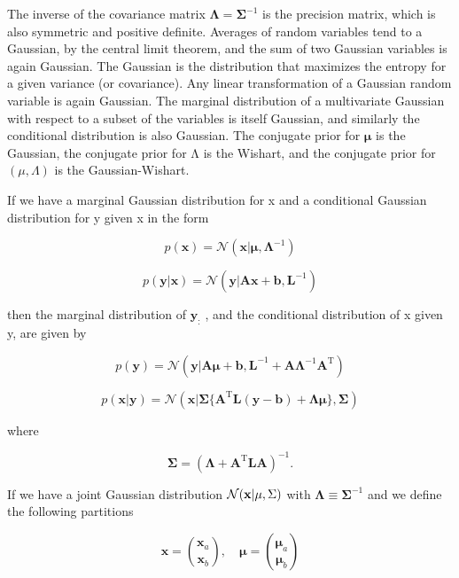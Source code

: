 \documentclass[
  10
]{article}
\begin{document}
The inverse of the covariance matrix
\(\pmb { \Lambda } = \pmb { \Sigma } ^ { - 1 }\) is the precision
matrix, which is also symmetric and positive definite. Averages of
random variables tend to a Gaussian, by the central limit theorem, and
the sum of two Gaussian variables is again Gaussian. The Gaussian is the
distribution that maximizes the entropy for a given variance (or
covariance). Any linear transformation of a Gaussian random variable is
again Gaussian. The marginal distribution of a multivariate Gaussian
with respect to a subset of the variables is itself Gaussian, and
similarly the conditional distribution is also Gaussian. The conjugate
prior for \(\pmb { \mu }\) is the Gaussian, the conjugate prior for Λ is
the Wishart, and the conjugate prior for \(( \mu , \Lambda )\) is the
Gaussian-Wishart.

If we have a marginal Gaussian distribution for x and a conditional
Gaussian distribution for y given x in the form

\[
{p (\mathbf {x})} = {\mathcal {N} (\mathbf {x} | \boldsymbol {\mu}, \boldsymbol {\Lambda} ^ {- 1})}\tag{B.42}
\]

\[
p (\mathbf {y} | \mathbf {x}) = \mathcal {N} (\mathbf {y} | \mathbf {A x} + \mathbf {b}, \mathbf {L} ^ {- 1})\tag{B.43}
\]

then the marginal distribution of \(\mathbf { y } _ { \mathrm { : } }\)
, and the conditional distribution of x given y, are given by

\[
{p (\mathbf {y})} = {\mathcal {N} (\mathbf {y} | \mathbf {A} \boldsymbol {\mu} + \mathbf {b}, \mathbf {L} ^ {- 1} + \mathbf {A} \boldsymbol {\Lambda} ^ {- 1} \mathbf {A} ^ {\mathrm{T}})}\tag{B.44}
\]

\[
{p (\mathbf {x} | \mathbf {y})} = {\mathcal {N} (\mathbf {x} | \boldsymbol {\Sigma} \{\mathbf {A} ^ {\mathrm{T}} \mathbf {L} (\mathbf {y} - \mathbf {b}) + \boldsymbol {\Lambda} \boldsymbol {\mu} \}, \boldsymbol {\Sigma})}\tag{B.45}
\]

where

\[
\boldsymbol {\Sigma} = \left(\boldsymbol {\Lambda} + \mathbf {A} ^ {\mathrm{T}} \mathbf {L} \mathbf {A}\right) ^ {- 1}.\tag{B.46}
\]

If we have a joint Gaussian distribution
\(\mathcal { N } ( { \bf x } | \mu , \Sigma )\) with
\(\pmb { \Lambda } \equiv \pmb { \Sigma } ^ { - 1 }\) and we define the
following partitions

\[
\mathbf {x} = \binom{\mathbf {x} _ {a}}{\mathbf {x} _ {b}}, \quad \boldsymbol {\mu} = \binom{\boldsymbol {\mu} _ {a}}{\boldsymbol {\mu} _ {b}}\tag{B.47}
\]
\end{document}
